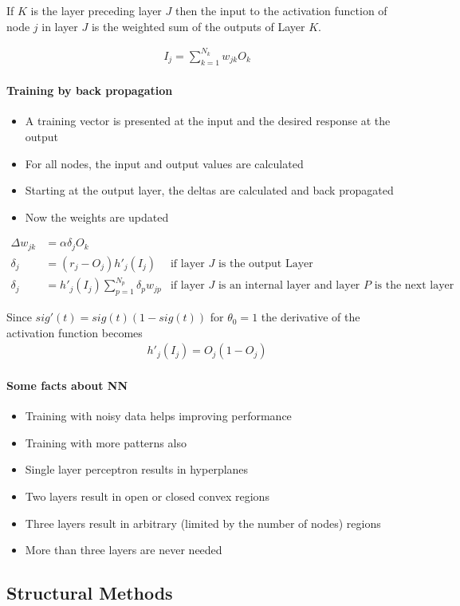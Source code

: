 If $K$ is the layer preceding layer $J$ then the input to the activation function of node $j$ in layer $J$ is the weighted sum of the outputs of Layer $K$.

\begin{align*}
I_j = \sum_{k=1}^{N_k}w_{jk}O_k
\end{align*}

\paragraph{Training by back propagation}
\begin{itemize}
\item A training vector is presented at
the input and the desired response
at the output
\item For all nodes, the input and output values are calculated
\item Starting at the output layer, the
deltas are calculated and back
propagated
\item Now the weights are updated
\end{itemize}

\begin{align*}
\Delta w_{jk} &= \alpha \delta_j O_k& \\
\delta_j &= (r_j-O_j) h'_j(I_j) & \text{if layer $J$ is the output Layer} \\
\delta_j &= h'_j(I_j) \sum_{p=1}^{N_p}\delta_p w_{jp} & \text{if layer $J$ is an internal layer and layer $P$ is the next layer}
\end{align*}

Since $sig'(t) = sig(t)(1-sig(t))$ for $\theta_0=1$ the derivative of the activation function becomes
\begin{align*}
h'_j(I_j) = O_j(1-O_j)
\end{align*}

\paragraph{Some facts about NN}
\begin{itemize}
\item Training with noisy data helps improving performance
\item Training with more patterns also
\item Single layer perceptron results in hyperplanes
\item Two layers result in open or closed convex regions
\item Three layers result in arbitrary (limited by the number of nodes) regions
\item More than three layers are never needed
\end{itemize}

\subsection{Structural Methods}

